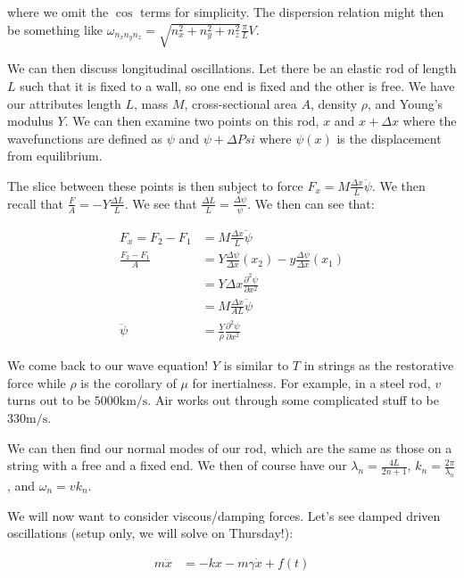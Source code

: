 \documentclass{report}
\begin{document}
where we omit the $\cos$ terms for simplicity. The dispersion relation might then be something like $\omega_{n_xn_yn_z} = \sqrt{n_x^2 + n_y^2 + n_z^2}\frac{\pi}{L}V$.

We can then discuss longitudinal oscillations. Let there be an elastic rod of length $L$ such that it is fixed to a wall, so one end is fixed and the other is free. We have our attributes length $L$, mass $M$, cross-sectional area $A$, density $\rho$, and Young's modulus $Y$. We can then examine two points on this rod, $x$ and $x + \Delta x$ where the wavefunctions are defined as $\psi$ and $\psi + \Delta Psi$ where $\psi(x)$ is the displacement from equilibrium. 

The slice between these points is then subject to force $F_x = M \frac{\Delta x}{L}\ddot{\psi}$. We then recall that $\frac{F}{A} = -Y \frac{\Delta L}{L}$. We see that $\frac{\Delta L}{L} = \frac{\Delta \psi}{\psi}$. We then can see that:

\begin{align*}
F_x = F_2 - F_1 &= M\frac{\Delta x}{L}\ddot{\psi}\\
\frac{F_2 - F_1}{A} &= Y \frac{\Delta \psi}{\Delta x}(x_2) - y \frac{\Delta \psi}{\Delta x}(x_1)\\
&= Y \Delta x \frac{\partial^2 \psi}{\partial x^2}\\
&= M \frac{\Delta x}{AL}\ddot{\psi}\\
\ddot{\psi} &= \frac{Y}{\rho}\frac{\partial^2 \psi}{\partial x^2}
\end{align*}

We come back to our wave equation! $Y$ is similar to $T$ in strings as the restorative force while $\rho$ is the corollary of $\mu$ for inertialness. For example, in a steel rod, $v$ turns out to be $5000 \mathrm{km/s}$. Air works out through some complicated stuff to be $330 \mathrm{m/s}$.

We can then find our normal modes of our rod, which are the same as those on a string with a free and a fixed end. We then of course have our $\lambda_n = \frac{4L}{2n+1}$, $k_n = \frac{2\pi}{\lambda_n}$, and $\omega_n = v k_n$.

We will now want to consider viscous/damping forces. Let's see damped driven oscillations (setup only, we will solve on Thursday!):

\begin{align*}
m\ddot{x} &= -kx - m\gamma\dot{x} + f(t)\\
\end{align*}
\end{document}
